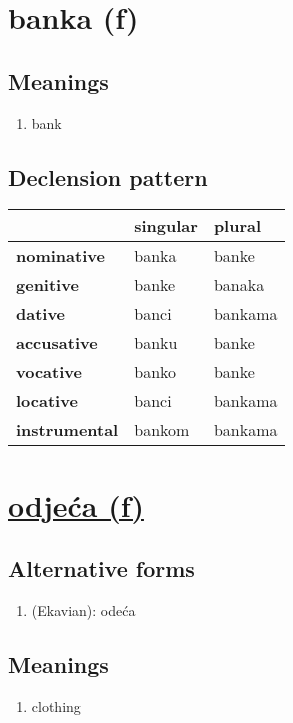 \filbreak
\section{banka (f)}
\subsection*{Meanings}
\begin{enumerate}
\item bank
\end{enumerate}
\subsection*{Declension pattern}
\begin{tabularx}{\linewidth}{Xll}
\toprule
{} & singular &   plural \\
\midrule
\textbf{nominative  } &    banka &    banke \\
\textbf{genitive    } &    banke &   banaka \\
\textbf{dative      } &    banci &  bankama \\
\textbf{accusative  } &    banku &    banke \\
\textbf{vocative    } &    banko &    banke \\
\textbf{locative    } &    banci &  bankama \\
\textbf{instrumental} &   bankom &  bankama \\
\bottomrule
\end{tabularx}

\filbreak
\section{\underline{odjeća (f)}}
\subsection*{Alternative forms}
\begin{enumerate}
\item (Ekavian): odeća
\end{enumerate}
\subsection*{Meanings}
\begin{enumerate}
\item clothing
\end{enumerate}
